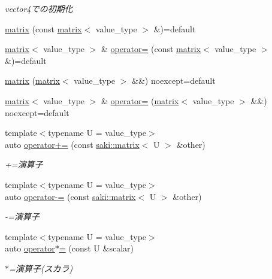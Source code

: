 \begin{DoxyCompactItemize}
\begin{DoxyCompactList}\small\item\em vector4での初期化 \end{DoxyCompactList}\item 
\mbox{\hyperlink{classsaki_1_1matrix_ad17aa0026d1a795166d6654b1df702c3}{matrix}} (const \mbox{\hyperlink{classsaki_1_1matrix}{matrix}}$<$ value\+\_\+type $>$ \&)=default
\item 
\mbox{\hyperlink{classsaki_1_1matrix}{matrix}}$<$ value\+\_\+type $>$ \& \mbox{\hyperlink{classsaki_1_1matrix_a38c5f7e666e3888d90b1c4017219f53f}{operator=}} (const \mbox{\hyperlink{classsaki_1_1matrix}{matrix}}$<$ value\+\_\+type $>$ \&)=default
\item 
\mbox{\hyperlink{classsaki_1_1matrix_a16b927b776bc7454ebbf984b7f93c23e}{matrix}} (\mbox{\hyperlink{classsaki_1_1matrix}{matrix}}$<$ value\+\_\+type $>$ \&\&) noexcept=default
\item 
\mbox{\hyperlink{classsaki_1_1matrix}{matrix}}$<$ value\+\_\+type $>$ \& \mbox{\hyperlink{classsaki_1_1matrix_a06a7330daf074554dada53978e3ccd55}{operator=}} (\mbox{\hyperlink{classsaki_1_1matrix}{matrix}}$<$ value\+\_\+type $>$ \&\&) noexcept=default
\item 
{\footnotesize template$<$typename U  = value\+\_\+type$>$ }\\auto \mbox{\hyperlink{classsaki_1_1matrix_ad004cb2830b0c22778b99b57fcbde8df}{operator+=}} (const \mbox{\hyperlink{classsaki_1_1matrix}{saki\+::matrix}}$<$ U $>$ \&other)
\begin{DoxyCompactList}\small\item\em +=演算子 \end{DoxyCompactList}\item 
{\footnotesize template$<$typename U  = value\+\_\+type$>$ }\\auto \mbox{\hyperlink{classsaki_1_1matrix_ae7c736de15ce97ad5d41193beeecf18d}{operator-\/=}} (const \mbox{\hyperlink{classsaki_1_1matrix}{saki\+::matrix}}$<$ U $>$ \&other)
\begin{DoxyCompactList}\small\item\em -\/=演算子 \end{DoxyCompactList}\item 
{\footnotesize template$<$typename U  = value\+\_\+type$>$ }\\auto \mbox{\hyperlink{classsaki_1_1matrix_ade74f7e19240123da31171ca469246e7}{operator$\ast$=}} (const U \&scalar)
\begin{DoxyCompactList}\small\item\em $\ast$=演算子(スカラ) \end{DoxyCompactList}\item 

\end{DoxyCompactItemize}
